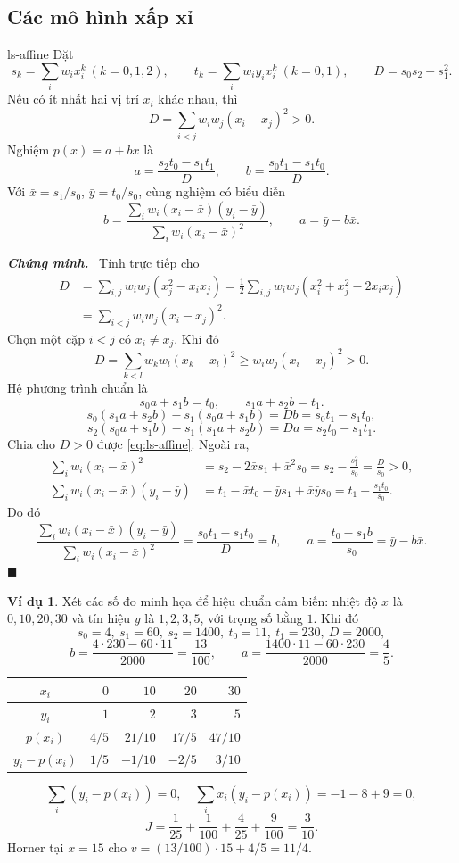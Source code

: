 \documentclass[12pt,a4paper,oneside]{book}
\numberwithin{algorithm}{chapter}
\theoremstyle{definition}
\newtheorem{vidu}{Ví dụ}[chapter]
\newenvironment{chungminh}{\par\medskip\noindent\textbf{\textit{\color{mainblue}Chứng minh.}}\ }{\hfill$\blacksquare$\par\medskip}
\begin{document}
\subsection{Các mô hình xấp xỉ}
\begin{menhde}{}{ls-affine}
Đặt
\[
 s_k=\sum_iw_ix_i^k\ (k=0,1,2),\qquad t_k=\sum_iw_iy_ix_i^k\ (k=0,1),\qquad D=s_0s_2-s_1^2.
\]
Nếu có ít nhất hai vị trí $x_i$ khác nhau, thì
\[
 D=\sum_{i<j}w_iw_j(x_i-x_j)^2>0.
\]
Nghiệm $p(x)=a+bx$ là
\begin{equation}\label{eq:ls-affine}
 a=\frac{s_2t_0-s_1t_1}D,\qquad b=\frac{s_0t_1-s_1t_0}D.
\end{equation}
Với $\bar x=s_1/s_0$, $\bar y=t_0/s_0$, cùng nghiệm có biểu diễn
\[
 b=\frac{\sum_iw_i(x_i-\bar x)(y_i-\bar y)}{\sum_iw_i(x_i-\bar x)^2},\qquad
 a=\bar y-b\bar x.
\]
\end{menhde}
\begin{chungminh}
Tính trực tiếp cho
\begin{align*}
 D&=\sum_{i,j}w_iw_j(x_j^2-x_ix_j)
 =\frac12\sum_{i,j}w_iw_j(x_i^2+x_j^2-2x_ix_j)\\
 &=\sum_{i<j}w_iw_j(x_i-x_j)^2.
\end{align*}
Chọn một cặp $i<j$ có $x_i\ne x_j$. Khi đó
\[
 D=\sum_{k<l}w_kw_l(x_k-x_l)^2
 \geq w_iw_j(x_i-x_j)^2>0.
\]
Hệ phương trình chuẩn là
\[
 s_0a+s_1b=t_0,\qquad s_1a+s_2b=t_1.
\]
\[
 s_0(s_1a+s_2b)-s_1(s_0a+s_1b)
 =Db=s_0t_1-s_1t_0,
\]
\[
 s_2(s_0a+s_1b)-s_1(s_1a+s_2b)
 =Da=s_2t_0-s_1t_1.
\]
Chia cho $D>0$ được \eqref{eq:ls-affine}. Ngoài ra,
\begin{align*}
 \sum_iw_i(x_i-\bar x)^2
 &=s_2-2\bar x s_1+\bar x^2s_0
 =s_2-\frac{s_1^2}{s_0}=\frac D{s_0}>0,\\
 \sum_iw_i(x_i-\bar x)(y_i-\bar y)
 &=t_1-\bar x t_0-\bar y s_1+\bar x\bar y s_0
 =t_1-\frac{s_1t_0}{s_0}.
\end{align*}
Do đó
\[
 \frac{\sum_iw_i(x_i-\bar x)(y_i-\bar y)}
      {\sum_iw_i(x_i-\bar x)^2}
 =\frac{s_0t_1-s_1t_0}D=b,\qquad
 a=\frac{t_0-s_1b}{s_0}=\bar y-b\bar x.
\]
\end{chungminh}
\begin{vidu}
Xét các số đo minh họa để hiệu chuẩn cảm biến: nhiệt độ $x$ là $0,10,20,30$ và tín hiệu $y$ là $1,2,3,5$, với trọng số bằng $1$. Khi đó
\[
 s_0=4,\ s_1=60,\ s_2=1400,\ t_0=11,\ t_1=230,\ D=2000,
\]
\[
 b=\frac{4\cdot230-60\cdot11}{2000}=\frac{13}{100},\qquad
 a=\frac{1400\cdot11-60\cdot230}{2000}=\frac45.
\]
\begin{center}\begin{tabular}{c|rrrr}\toprule
$x_i$&$0$&$10$&$20$&$30$\\\midrule
$y_i$&$1$&$2$&$3$&$5$\\
$p(x_i)$&$4/5$&$21/10$&$17/5$&$47/10$\\
$y_i-p(x_i)$&$1/5$&$-1/10$&$-2/5$&$3/10$\\\bottomrule
\end{tabular}\end{center}
\[
 \sum_i(y_i-p(x_i))=0,\quad\sum_ix_i(y_i-p(x_i))=-1-8+9=0,
\]
\[
 J=\frac1{25}+\frac1{100}+\frac4{25}+\frac9{100}=\frac3{10}.
\]
Horner tại $x=15$ cho $v=(13/100)\cdot15+4/5=11/4$.
\end{vidu}
\end{document}
